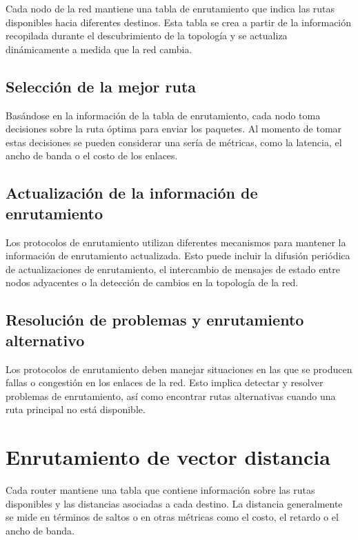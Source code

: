Cada nodo de la red mantiene una tabla de enrutamiento que indica las rutas disponibles hacia diferentes destinos. Esta tabla se crea a partir de la información recopilada durante el descubrimiento de la topología y se actualiza dinámicamente a medida que la red cambia.

\subsection{Selección de la mejor ruta}

Basándose en la información de la tabla de enrutamiento, cada nodo toma decisiones sobre la ruta óptima para enviar los paquetes. Al momento de tomar estas decisiones se pueden considerar una sería de  métricas, como la latencia, el ancho de banda o el costo de los enlaces.

\subsection{Actualización de la información de enrutamiento}

Los protocolos de enrutamiento utilizan diferentes mecanismos para mantener la información de enrutamiento actualizada. Esto puede incluir la difusión periódica de actualizaciones de enrutamiento, el intercambio de mensajes de estado entre nodos adyacentes o la detección de cambios en la topología de la red.

\subsection{Resolución de problemas y enrutamiento alternativo}

Los protocolos de enrutamiento deben manejar situaciones en las que se producen fallas o congestión en los enlaces de la red. Esto implica detectar y resolver problemas de enrutamiento, así como encontrar rutas alternativas cuando una ruta principal no está disponible.

\section{Enrutamiento de vector distancia}

Cada router mantiene una tabla  que contiene información sobre las rutas disponibles y las distancias asociadas a cada destino. La distancia generalmente se mide en términos de saltos o en otras métricas como el costo, el retardo o el ancho de banda.\citep{rip}


